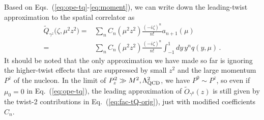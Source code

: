 \documentclass[prd,aps,twocolumn,preprintnumbers,showpacs,nofootinbib,superscriptaddress,notitlepage]{revtex4-1}
\newcommand{\nn}{\nonumber}
\begin{document}
Based on Eqs.~(\ref{eq:ope-tq}-\ref{eq:moment}), we can write down the leading-twist approximation to the spatial correlator as
\begin{align} \label{eq:fac-tQ-orig}
\tilde{Q}_{\gamma^z} \bigl(\zeta, {\mu}^2 z^2\bigr)
=&  \sum_{n} C_n ({\mu}^2 z^2)  \frac{(-i \zeta)^n}{n!} a_{n + 1}
 \left(\mu\right)
 \\
= & \sum_{n} C_n (\mu^2z^2)
\frac{(-i \zeta)^n}{n!}  \int_{-1}^1 dy\,y^n q \left( y, \mu\right)
 \,.  \nn
\end{align}
It should be noted that the only approximation we have made so far is ignoring
the higher-twist effects that are suppressed by small $z^2$ and the large momentum $P^z$ of the nucleon. In the limit of $P_z^2\gg M^2,\Lambda_{\rm QCD}^2$, we have $P^0\sim P^z$, so even if $\mu_0=0$ in Eq.~(\ref{eq:ope-tq}), the leading approximation of $\tilde{O}_{\gamma^0}(z)$ is still given by the twist-2 contributions in Eq.~(\ref{eq:fac-tQ-orig}), just with modified coefficients $C_n$.
\end{document}
